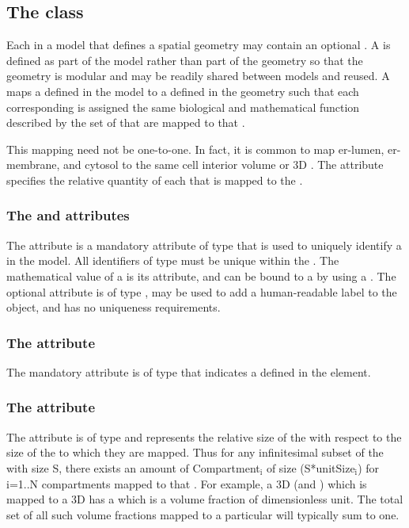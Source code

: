 \subsection{The  class}
\label{compartmentmapping-class}
Each \Compartment in a model that defines a spatial geometry may contain an optional \CompartmentMapping. A \CompartmentMapping is defined as part of the model rather than part of the geometry so that the geometry is modular and may be readily shared between models and reused.  A \CompartmentMapping maps a \Compartment defined in the model to a \DomainType defined in the geometry such that each corresponding \DomainType is assigned the same biological and mathematical function described by the set of \Compartments that are mapped to that \DomainType. 

This mapping need not be one-to-one.  In fact, it is common to map er-lumen, er-membrane, and cytosol to the same cell interior volume or 3D \DomainType.  The  attribute specifies the relative quantity of each \Compartment that is mapped to the \DomainType.

\subsubsection{The \fixttspace{} and \fixttspace{} attributes}
The  attribute is a mandatory attribute of type  that is used to uniquely identify a \CompartmentMapping in the model.  All identifiers of type  must be unique within the \Model.  The mathematical value of a \CompartmentMapping is its  attribute, and can be bound to a \Parameter by using a \SpatialSymbolReference {}.  The optional  attribute is of type , may be used to add a human-readable label to the object, and has no uniqueness requirements.

\subsubsection{The \fixttspace{} attribute}
The mandatory  attribute is of type  that indicates a \DomainType defined in the \Geometry element.

\subsubsection{The \fixttspace{} attribute}
The  attribute is of type  and represents the relative size of the \Compartment with respect to the size of the \Domains to which they are mapped.  Thus for any infinitesimal subset of the \Domain with size S, there exists an amount of Compartment$_{\text{i}}$ of size (S*unitSize$_{\text{i}}$) for i=1..N compartments mapped to that \DomainType.  For example, a 3D \Compartment (and \DomainType) which is mapped to a 3D \DomainType has a  which is a volume fraction of dimensionless unit.  The total set of all such volume fractions mapped to a particular \DomainType will typically sum to one. 

